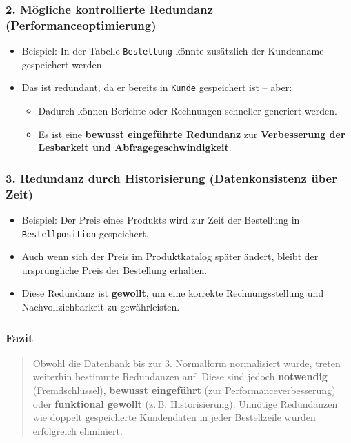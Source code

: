 \documentclass[a4paper,12pt]{article}
\begin{document}
\begin{enumerate}
		\subsubsection*{2. Mögliche kontrollierte Redundanz (Performanceoptimierung)}
		
		\begin{itemize}
			\item Beispiel: In der Tabelle \texttt{Bestellung} könnte zusätzlich der Kundenname gespeichert werden.
			\item Das ist redundant, da er bereits in \texttt{Kunde} gespeichert ist – aber:
			\begin{itemize}
				\item Dadurch können Berichte oder Rechnungen schneller generiert werden.
				\item Es ist eine \textbf{bewusst eingeführte Redundanz} zur \textbf{Verbesserung der Lesbarkeit und Abfragegeschwindigkeit}.
			\end{itemize}
		\end{itemize}
		
		\subsubsection*{3. Redundanz durch Historisierung (Datenkonsistenz über Zeit)}
		
		\begin{itemize}
			\item Beispiel: Der Preis eines Produkts wird zur Zeit der Bestellung in \texttt{Bestellposition} gespeichert.
			\item Auch wenn sich der Preis im Produktkatalog später ändert, bleibt der ursprüngliche Preis der Bestellung erhalten.
			\item Diese Redundanz ist \textbf{gewollt}, um eine korrekte Rechnungsstellung und Nachvollziehbarkeit zu gewährleisten.
		\end{itemize}
		
		\subsubsection*{Fazit}
		
		\begin{quote}
			Obwohl die Datenbank bis zur 3. Normalform normalisiert wurde, treten weiterhin bestimmte Redundanzen auf. Diese sind jedoch \textbf{notwendig} (Fremdschlüssel), \textbf{bewusst eingeführt} (zur Performanceverbesserung) oder \textbf{funktional gewollt} (z.\,B. Historisierung).  
			Unnötige Redundanzen wie doppelt gespeicherte Kundendaten in jeder Bestellzeile wurden erfolgreich eliminiert.
		\end{quote}
		

\end{enumerate}
\end{document}
